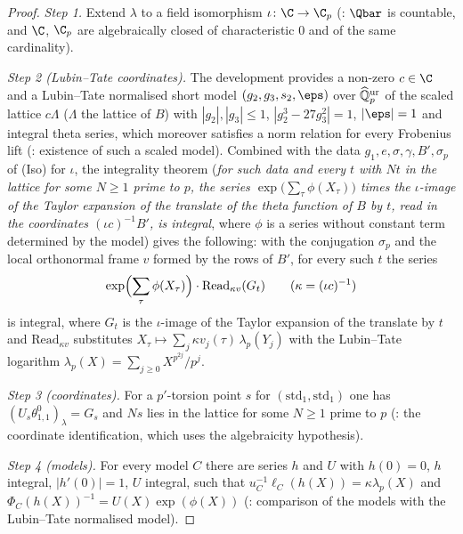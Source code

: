 \begin{proof}
\emph{Step 1.} Extend $\lambda$ to a field isomorphism $\iota\colon\C\to\C_p$
(: $\Qbar$ is countable, and $\C$, $\C_p$ are algebraically closed of
characteristic $0$ and of the same cardinality).

\emph{Step 2 (Lubin--Tate coordinates).} The development provides a non-zero $c\in\C$ and a Lubin--Tate normalised short
model $(g_2,g_3,s_2,\eps)$ over $\widehat{\mathbb{Q}}{}_p^{\mathrm{ur}}$ of the scaled lattice $c\Lambda$ ($\Lambda$ the lattice of $B$) with
$|g_2|,|g_3|\le1$, $|g_2^3-27g_3^2|=1$, $|\eps|=1$ and integral theta series, which moreover satisfies a norm relation for
every Frobenius lift (: existence of such a scaled model). Combined
with the data $g_1,e,\sigma,\gamma,B',\sigma_p$ of \textup{(Iso)} for $\iota$, the integrality theorem
 (\emph{for such data and every $t$ with $Nt$ in the lattice for some
$N\ge1$ prime to $p$, the series $\exp\bigl(\sum_\tau\phi(X_\tau)\bigr)$ times the $\iota$-image of the Taylor expansion of
the translate of the theta function of $B$ by $t$, read in the coordinates $(\iota c)^{-1}B'$, is integral}, where
$\phi$ is a series without constant term determined by the model) gives the following: with the conjugation $\sigma_p$ and
the local orthonormal frame $v$ formed by the rows of $B'$, for every such $t$ the series
\begin{equation}\label{pf:reckernel:eq-LTint}
\exp\Bigl(\sum_{\tau}\phi(X_\tau)\Bigr)\cdot\mathrm{Read}_{\kappa v}(G_t)\qquad(\kappa=(\iota c)^{-1})
\end{equation}
is integral, where $G_t$ is the $\iota$-image of the Taylor expansion of the translate by $t$ and $\mathrm{Read}_{\kappa v}$
substitutes $X_\tau\mapsto\sum_j\kappa v_j(\tau)\,\lambda_p(Y_j)$ with the Lubin--Tate logarithm
$\lambda_p(X)=\sum_{j\ge0}X^{p^{2j}}/p^j$.

\emph{Step 3 (coordinates).} For a $p'$-torsion point $s$ for $(\mathrm{std}_1,\mathrm{std}_1)$ one has
$(U_s\theta^0_{1,1})_\lambda=G_s$ and $Ns$ lies in the lattice for some $N\ge1$ prime to $p$
(: the coordinate identification, which uses the algebraicity
hypothesis).

\emph{Step 4 (models).} For every model $C$ there are series $h$ and $U$ with $h(0)=0$, $h$ integral, $|h'(0)|=1$, $U$
integral, such that $u_C^{-1}\ell_C(h(X))=\kappa\lambda_p(X)$ and $\Phi_C(h(X))^{-1}=U(X)\exp(\phi(X))$
(: comparison of the models with the Lubin--Tate
normalised model).


\end{proof}
